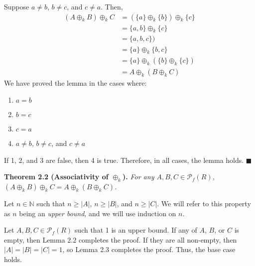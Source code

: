 \documentclass{article}
\newcommand{\abs}[1]{\left|#1\right|}
\newcommand{\N}{\mathbb{N}}
\begin{document}
Suppose $a \neq b$, $b \neq c$, and $c \neq a$. Then,
\[\begin{split}
    (A \oplus_k B) \oplus_k C
    &= (\{a\} \oplus_k \{b\}) \oplus_k \{c\} \\
    &= \{a, b\} \oplus_k \{c\} \\
    &= \{a, b, c\}) \\
    &= \{a\} \oplus_k \{b, c\} \\
    &= \{a\} \oplus_k (\{b\} \oplus_k \{c\}) \\
    &= A \oplus_k (B \oplus_k C)
\end{split}\]
We have proved the lemma in the cases where:
\begin{enumerate}
    \item $a = b$
    \item $b = c$
    \item $c = a$
    \item $a \neq b$, $b \neq c$, and $c \neq a$
\end{enumerate}
If 1, 2, and 3 are false, then 4 is true. Therefore,
in all cases, the lemma holds.
$\blacksquare$

\textbf{Theorem 2.2 (Associativity of $\oplus_k$).} \textit{
    For any $A, B, C \in \mathcal{P}_f(R)$,
    $(A \oplus_k B) \oplus_k C = A \oplus_k (B \oplus_k C)$.
}

Let $n \in \N$ such that $n \geq \abs{A}$, $n \geq \abs{B}$, and
$n \geq \abs{C}$. We will refer to this property as $n$ being
an \textit{upper bound}, and we will use induction on $n$.

Let $A, B, C \in \mathcal{P}_f(R)$
such that 1 is an upper bound.
If any of $A$, $B$,
or $C$ is empty, then Lemma 2.2 completes the proof.
If they are all non-empty, then
$\abs{A} = \abs{B} = \abs{C} = 1$, so Lemma 2.3
completes the proof. Thus, the base case holds.
\end{document}
